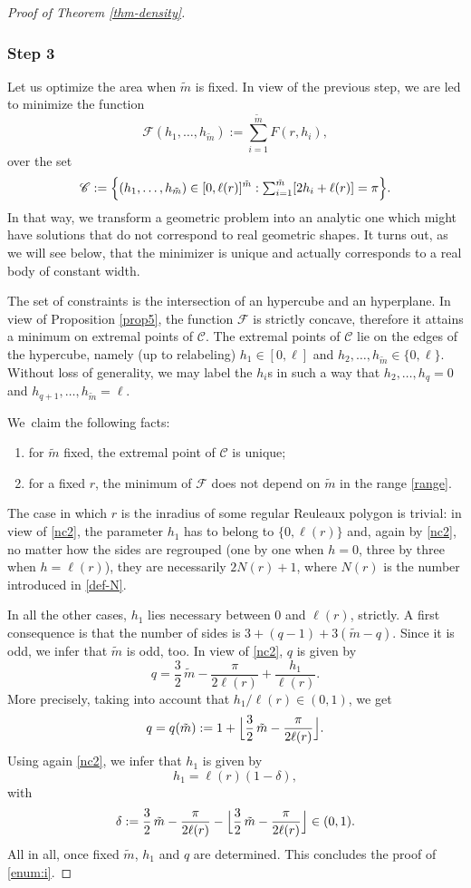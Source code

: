 \documentclass[JEP,XML,SOM,Unicode,NoFloatCountersInSection]{cedram}
\let\mathcal\mathscr
\let\sep :
\theoremstyle{plain}
\theoremstyle{definition}
\begin{document}
\begin{proof}[Proof of Theorem \ref{thm-density}]
\subsubsection*{Step 3} Let us optimize the area when $\tilde{m}$ is fixed. In view of the previous step, we are led to minimize the function
\[
\mathcal F(h_1,\ldots, h_{\tilde{m}}):=\sum_{i=1}^{\tilde{m}} F(r,h_i),
\]
over the set
\[
\mathcal C:=\Bigl\{ (h_1,\ldots, h_{\tilde{m}})\in [0,\ell(r)]^{\tilde{m}}\sep\textstyle \sum_{i=1}^{\tilde{m}} [2h_i + \ell(r)] = \pi\Bigr\}.
\]
In that way, we transform a geometric problem into an analytic one which might have
solutions that do not correspond to real geometric shapes. It turns out, as we will see
below, that the minimizer is unique and actually corresponds to a real body of constant width.

The set of constraints is the intersection of an hypercube and an hyperplane. In view of Proposition \ref{prop5}, the function $\mathcal F$ is strictly concave, therefore it attains a minimum on extremal points of $\mathcal C$. The extremal points of $\mathcal C$ lie on the edges of the hypercube, namely (up to relabeling) $h_1\in [0,\ell]$ and $h_2,\ldots, h_{\tilde{m}}\in \{0,\ell\}$. \hbox{Without} loss of generality, we may label the $h_i$s in such a way that $h_2,\ldots, h_q=0$ and $h_{q+1}, \ldots, h_{\tilde{m}}=\ell$.

We~claim the following facts:
\begin{enumerate}
\item\label{enum:i}
for $\tilde{m}$ fixed, the extremal point of $\mathcal C$ is unique;
\item\label{enum:ii}
for a fixed $r$, the minimum of $\mathcal F$ does not depend on $\tilde{m}$ in the range \eqref{range}.
\end{enumerate}
The case in which $r$ is the inradius of some regular Reuleaux polygon is trivial: in view of \eqref{nc2}, the parameter $h_1$ has to belong to $\{0,\ell(r)\}$ and, again by \eqref{nc2}, no matter how the sides are regrouped (one by one when $h=0$, three by three when $h=\ell(r)$), they are necessarily $2N(r)+1$, where $N(r)$ is the number introduced in \eqref{def-N}.

In all the other cases, $h_1$ lies necessary between $0$ and $\ell(r)$, strictly. A first consequence is that the number of sides is $3 + (q-1)+3(\tilde{m}-q)$. Since it is odd, we infer that $\tilde{m}$ is odd, too. In view of \eqref{nc2}, $q$ is given by
\[
q = \frac32\, \tilde{m} - \frac{\pi}{2\ell(r)}+ \frac{h_1}{\ell(r)}.
\]
More precisely, taking into account that $h_1/\ell(r) \in (0,1)$, we get
\[
q=q(\tilde{m}):=1+\Bigl\lfloor \frac32\, \tilde{m} - \frac{\pi}{2\ell(r)} \Bigr\rfloor.
\]
Using again \eqref{nc2}, we infer that $h_1$ is given by
\[
h_1=\ell(r)(1-\delta),
\]
with
\[
\delta:= \frac32\, \tilde{m} - \frac{\pi}{2\ell(r)} - \Bigl\lfloor \frac32\, \tilde{m} - \frac{\pi}{2\ell(r)}\Bigr\rfloor \in (0,1).
\]
All in all, once fixed $\tilde{m}$, $h_1$ and $q$ are determined. This concludes the proof of \eqref{enum:i}.


\end{proof}
\end{document}

